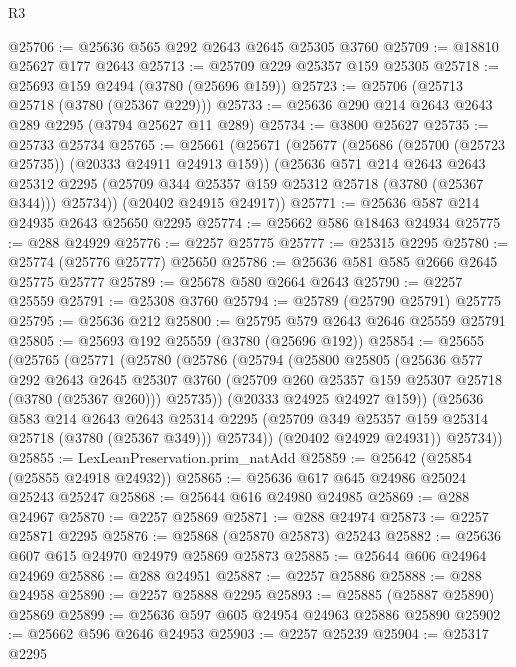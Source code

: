 \begin{lexlean}{R3}
\begin{coremodule}
@25706 := @25636 @565 @292 @2643 @2645 @25305 @3760
@25709 := @18810 @25627 @177 @2643
@25713 := @25709 @229 @25357 @159 @25305
@25718 := @25693 @159 @2494 (@3780 (@25696 @159))
@25723 := @25706 (@25713 @25718 (@3780 (@25367 @229)))
@25733 := @25636 @290 @214 @2643 @2643 @289 @2295 (@3794 @25627 @11 @289)
@25734 := @3800 @25627
@25735 := @25733 @25734
@25765 := @25661
    (@25671
      (@25677
        (@25686 (@25700 (@25723 @25735)) (@20333 @24911 @24913 @159))
        (@25636
          @571
          @214
          @2643
          @2643
          @25312
          @2295
          (@25709 @344 @25357 @159 @25312 @25718 (@3780 (@25367 @344)))
          @25734))
      (@20402 @24915 @24917))
@25771 := @25636 @587 @214 @24935 @2643 @25650 @2295
@25774 := @25662 @586 @18463 @24934
@25775 := @288 @24929
@25776 := @2257 @25775
@25777 := @25315 @2295
@25780 := @25774 (@25776 @25777) @25650
@25786 := @25636 @581 @585 @2666 @2645 @25775 @25777
@25789 := @25678 @580 @2664 @2643
@25790 := @2257 @25559
@25791 := @25308 @3760
@25794 := @25789 (@25790 @25791) @25775
@25795 := @25636 @212
@25800 := @25795 @579 @2643 @2646 @25559 @25791
@25805 := @25693 @192 @25559 (@3780 (@25696 @192))
@25854 := @25655
    (@25765
      (@25771
        (@25780
          (@25786
            (@25794
              (@25800
                @25805
                (@25636
                  @577
                  @292
                  @2643
                  @2645
                  @25307
                  @3760
                  (@25709 @260 @25357 @159 @25307 @25718 (@3780 (@25367 @260)))
                  @25735))
              (@20333 @24925 @24927 @159))
            (@25636
              @583
              @214
              @2643
              @2643
              @25314
              @2295
              (@25709 @349 @25357 @159 @25314 @25718 (@3780 (@25367 @349)))
              @25734))
          (@20402 @24929 @24931))
        @25734))
@25855 := LexLeanPreservation.prim_natAdd
@25859 := @25642 (@25854 (@25855 @24918 @24932))
@25865 := @25636 @617 @645 @24986 @25024 @25243 @25247
@25868 := @25644 @616 @24980 @24985
@25869 := @288 @24967
@25870 := @2257 @25869
@25871 := @288 @24974
@25873 := @2257 @25871 @2295
@25876 := @25868 (@25870 @25873) @25243
@25882 := @25636 @607 @615 @24970 @24979 @25869 @25873
@25885 := @25644 @606 @24964 @24969
@25886 := @288 @24951
@25887 := @2257 @25886
@25888 := @288 @24958
@25890 := @2257 @25888 @2295
@25893 := @25885 (@25887 @25890) @25869
@25899 := @25636 @597 @605 @24954 @24963 @25886 @25890
@25902 := @25662 @596 @2646 @24953
@25903 := @2257 @25239
@25904 := @25317 @2295

\end{coremodule}
\end{lexlean}
